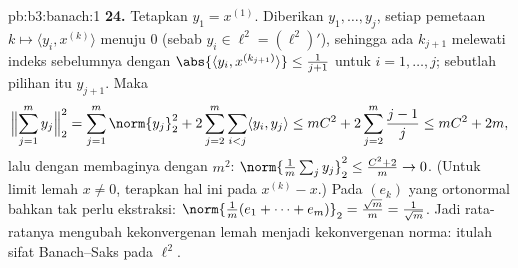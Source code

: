 \begin{solution}{pb:b3:banach:1}
\textbf{24.} Tetapkan $y_1 = x^{(1)}$. Diberikan $y_1, \dots, y_j$,
setiap pemetaan $k \mapsto \langle y_i, x^{(k)}\rangle$ menuju $0$
(sebab $y_i \in \ell^2 = (\ell^2)'$), sehingga ada $k_{j+1}$ melewati
indeks sebelumnya dengan $\abs{\langle y_i,
x^{(k_{j+1})}\rangle} \leq \frac1{j+1}$ untuk $i = 1, \dots,
j$; sebutlah pilihan itu $y_{j+1}$. Maka
\[
\Bigl\lVert\sum_{j=1}^my_j\Bigr\rVert_2^2
= \sum_{j=1}^m\norm{y_j}_2^2
+ 2\sum_{j=2}^m\sum_{i<j}\langle y_i, y_j\rangle
\leq mC^2 + 2\sum_{j=2}^m\frac{j-1}j
\leq mC^2 + 2m,
\]
lalu dengan membaginya dengan $m^2$: $\norm{\frac1m\sum_jy_j}_2^2 \leq
\frac{C^2 + 2}m \to 0$. (Untuk limit lemah $x \neq 0$, terapkan
hal ini pada $x^{(k)} - x$.) Pada $(e_k)$ yang ortonormal bahkan tak perlu
ekstraksi: $\norm{\frac1m(e_1 + \dots +
e_m)}_2 = \frac{\sqrt m}m = \frac1{\sqrt m}$. Jadi rata-ratanya
mengubah kekonvergenan lemah menjadi kekonvergenan norma: itulah
sifat Banach--Saks pada $\ell^2$.


\end{solution}
